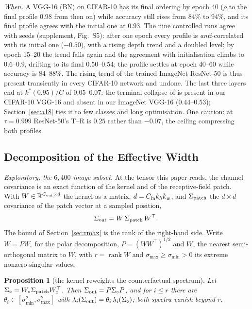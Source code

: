 \documentclass[10pt,journal,compsoc]{IEEEtran}
\newtheorem{proposition}{Proposition}
\begin{document}
\emph{When.} A VGG-16 (BN) on CIFAR-10 has its final ordering by epoch 40
($\rho$ to the final profile $0.98$ from then on) while accuracy still
rises from $84\%$ to $94\%$, and its final profile agrees with the initial
one at $0.93$. The nine controlled runs agree with seeds (supplement,
Fig.~S5): after one epoch every profile is \emph{anti}-correlated with
its initial one ($-0.50$), with a rising depth trend and a doubled level;
by epoch 15--20 the trend falls again and the agreement with
initialisation climbs to $0.6$--$0.9$, drifting to its final
$0.50$--$0.54$; the profile settles at epoch 40--60 while accuracy is
$84$--$88\%$. The rising trend of the trained ImageNet ResNet-50 is thus
present transiently in every CIFAR-10 network and undone. The last three
layers end at $k^*(0.95)/C$ of $0.05$--$0.07$: the terminal collapse of
\cite{garg2019lowEffort} is present in our CIFAR-10 VGG-16 and absent in
our ImageNet VGG-16 ($0.44$--$0.53$); Section~\ref{sec:a18} ties it to
few classes and long optimisation. One caution: at $\tau = 0.999$
ResNet-50's T--R is $0.25$ rather than $-0.07$, the ceiling compressing
both profiles.

\subsection{Decomposition of the Effective Width}
\label{sec:decompose}

\emph{Exploratory; the $6{,}400$-image subset.} At the tensor this paper
reads, the channel covariance is an exact function of the kernel and of
the receptive-field patch. With $W \in \mathbb{R}^{C_{\rm out} \times d}$
the kernel as a matrix, $d = C_{\rm in} k_h k_w$, and $\Sigma_{\rm patch}$
the $d \times d$ covariance of the patch vector at a sampled position,
\begin{equation}
  \Sigma_{\rm out} = W\, \Sigma_{\rm patch}\, W^{\top}.
  \label{eq:decomp}
\end{equation}
The bound of Section~\ref{sec:rmax} is the rank of the right-hand side.
Write $W = P W_{\circ}$ for the polar decomposition, $P = (WW^{\top})^{1/2}$
and $W_{\circ}$ the nearest semi-orthogonal matrix to $W$, with
$r = \operatorname{rank} W$ and $\sigma_{\max} \ge \sigma_{\min} > 0$ its
extreme nonzero singular values.

\begin{proposition}[the kernel reweights the counterfactual spectrum]
\label{prop:ostrowski}
Let $\Sigma_{\circ} = W_{\circ} \Sigma_{\rm patch} W_{\circ}^{\top}$. Then
$\Sigma_{\rm out} = P \Sigma_{\circ} P$, and for $i \le r$ there are
$\theta_i \in [\sigma_{\min}^2, \sigma_{\max}^2]$ with
$\lambda_i(\Sigma_{\rm out}) = \theta_i\, \lambda_i(\Sigma_{\circ})$; both
spectra vanish beyond $r$.
\end{proposition}
\end{document}
